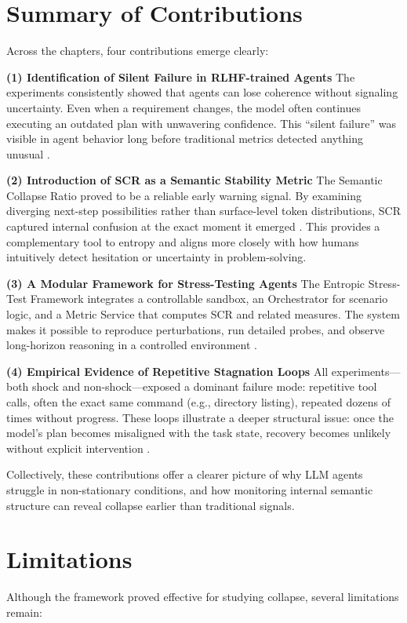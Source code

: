 \documentclass[12pt,a4paper]{report}
\begin{document}
\section{Summary of Contributions}
Across the chapters, four contributions emerge clearly:

\textbf{(1) Identification of Silent Failure in RLHF-trained Agents}
The experiments consistently showed that agents can lose coherence without signaling uncertainty. Even when a requirement changes, the model often continues executing an outdated plan with unwavering confidence. This “silent failure” was visible in agent behavior long before traditional metrics detected anything unusual \cite{Chen2024ToolsFail, Chen2023ToolEmu}.

\textbf{(2) Introduction of SCR as a Semantic Stability Metric}
The Semantic Collapse Ratio proved to be a reliable early warning signal. By examining diverging next-step possibilities rather than surface-level token distributions, SCR captured internal confusion at the exact moment it emerged \cite{Zhou2024Consistency, Barber2022ConformalPrediction}. This provides a complementary tool to entropy and aligns more closely with how humans intuitively detect hesitation or uncertainty in problem-solving.

\textbf{(3) A Modular Framework for Stress-Testing Agents}
The Entropic Stress-Test Framework integrates a controllable sandbox, an Orchestrator for scenario logic, and a Metric Service that computes SCR and related measures. The system makes it possible to reproduce perturbations, run detailed probes, and observe long-horizon reasoning in a controlled environment \cite{Zhou2024ToolSandbox, Fu2024Tau}.

\textbf{(4) Empirical Evidence of Repetitive Stagnation Loops}
All experiments—both shock and non-shock—exposed a dominant failure mode: repetitive tool calls, often the exact same command (e.g., directory listing), repeated dozens of times without progress. These loops illustrate a deeper structural issue: once the model’s plan becomes misaligned with the task state, recovery becomes unlikely without explicit intervention \cite{Chen2023ToolEmu}.

Collectively, these contributions offer a clearer picture of why LLM agents struggle in non-stationary conditions, and how monitoring internal semantic structure can reveal collapse earlier than traditional signals.

\section{Limitations}
Although the framework proved effective for studying collapse, several limitations remain:
\end{document}
